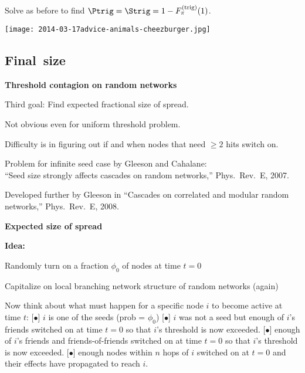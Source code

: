     Solve as before to find $\Ptrig =  \Strig = 1 - F_\pi^{(\textnormal{trig)}}(1)$.
  

\begin{frame}[plain]
  \texttt{[image: 2014-03-17advice-animals-cheezburger.jpg]}

\subsection{Final\ size}

  \textbf{Threshold contagion on random networks}

  
  
    \alert{Third goal:} Find expected fractional size of spread.
  
    Not obvious even for uniform threshold problem.
  
    Difficulty is in figuring out if and when
    nodes that need $\ge 2$ hits switch on.
  
    Problem  for infinite seed case by Gleeson and Cahalane:\\
    ``Seed size strongly affects cascades on random networks,'' 
    Phys.\ Rev.\ E, 2007.\cite{gleeson2007a}
  
    Developed further by Gleeson
    in ``Cascades on correlated and modular random networks,'' 
    Phys.\ Rev.\ E, 2008.\cite{gleeson2008a}
  


  \textbf{Expected size of spread}

  \textbf{Idea:}
    
     
      Randomly turn on a fraction $\phi_0$ of nodes at time $t=0$
     
      Capitalize on local branching network structure of random
      networks (again)
     
      Now think about what must happen for
      a specific node $i$ to become active at time $t$:
    [$\bullet$]
       $i$ is one of the seeds (prob = $\phi_0$)
    [$\bullet$]
       $i$ was not a seed but enough of $i$'s friends switched
      on at time $t=0$ so that $i$'s threshold is now exceeded.
    [$\bullet$] 
       enough of $i$'s friends and friends-of-friends switched
      on at time $t=0$ so that $i$'s threshold is now exceeded.
    [$\bullet$] 
       enough nodes within $n$ hops of $i$ 
      switched on at $t=0$ and their effects have propagated to reach $i$.
    
  




\end{frame}
